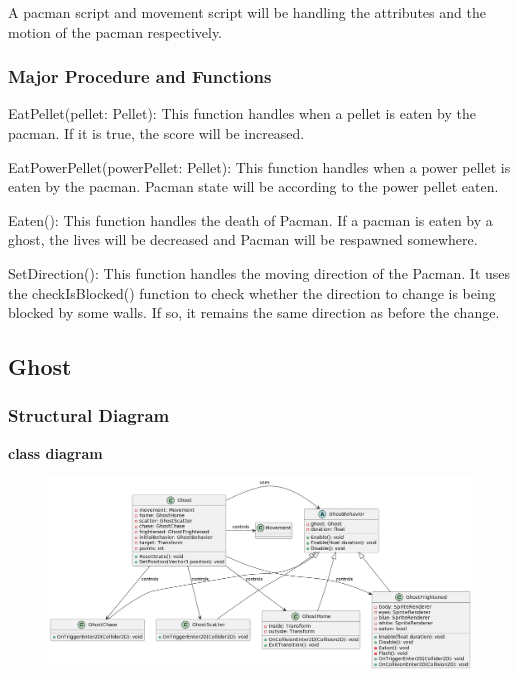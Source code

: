 \documentclass[11pt]{article}
\begin{document}
A pacman script and movement script will be handling the attributes and the motion of the pacman respectively.

\subsubsection{Major Procedure and Functions}
EatPellet(pellet: Pellet): This function handles when a pellet is eaten by the pacman. If it is true, the score will be increased.

EatPowerPellet(powerPellet: Pellet): This function handles when a power pellet is eaten by the pacman. Pacman state will be according to the power pellet eaten.

Eaten(): This function handles the death of Pacman. If a pacman is eaten by a ghost, the lives will be decreased and Pacman will be respawned somewhere.

SetDirection(): This function handles the moving direction of the Pacman. It uses the checkIsBlocked() function to check whether the direction to change is being blocked by some walls. If so, it remains the same direction as before the change.
\subsection{Ghost}
\subsubsection{Structural Diagram}
\textbf{class diagram}\\
\begin{figure}[H]
    \centering
    \includegraphics*[scale=0.25]{Ghost_Class.png}
\end{figure}
\end{document}
